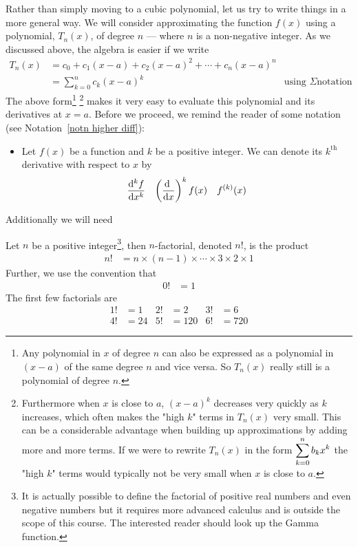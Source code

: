 Rather than simply moving to a cubic polynomial, let us try to write things in a more
general way. We will consider approximating the function $f(x)$ using a polynomial,
$T_n(x)$, of degree $n$ --- where $n$ is a non-negative integer. As we discussed
above, the algebra is easier if we write
\begin{align*}
  T_n(x) &= c_0 + c_1(x-a) + c_2 (x-a)^2 + \cdots + c_n (x-a)^n\\
  &= \sum_{k=0}^n c_k (x-a)^k & \text{using $\Sigma$
notation}
\end{align*}
The above form\footnote{Any polynomial in $x$ of degree $n$ can also be
expressed as a polynomial in $(x-a)$ of the same degree $n$ and vice versa.  So
$T_n(x)$ really still is a polynomial of degree $n$.} \footnote{Furthermore
when $x$ is close to $a$, $(x-a)^k$ decreases very quickly as $k$ increases,
which often makes the "high $k$" terms in $T_n(x)$ very small. This can be a
considerable advantage when building up approximations by adding more and more
terms.  If we were to rewrite  $T_n(x)$ in the form $\displaystyle \sum_{k=0}^n b_k x^k$
the "high $k$" terms would typically not be very small when $x$ is close to
$a$. } makes it very easy to evaluate this polynomial and its derivatives at
$x=a$. Before we proceed, we remind the reader of some notation (see
Notation~\ref{notn higher diff}):
\begin{itemize}
 \item Let $f(x)$ be a function and $k$ be a positive integer. We can denote
its $k^\mathrm{th}$ derivative with respect to $x$ by
\begin{align*}
  \ddiff{k}{f}{x} && \left( \diff{}{x}\right)^k f(x) && f^{(k)}(x)
\end{align*}
\end{itemize}

Additionally we will need
\begin{defn}[Factorial]
  Let $n$ be a positive integer\footnote{It is actually possible to define the
factorial of positive real numbers and even negative numbers but it requires more
advanced calculus and is outside the scope of this course. The interested reader should
look up the Gamma function.}, then $n$-factorial, denoted $n!$, is the product
  \begin{align*}
    n! &= n \times (n-1) \times \cdots \times 3 \times 2 \times 1
  \end{align*}
  Further, we use the convention that
  \begin{align*}
  0! &= 1
  \end{align*}
  The first few factorials are
\begin{align*}
  1! &=1 &
  2! &=2 &
  3! &=6 \\
  4! &=24 &
  5! &=120 &
  6! &=720
\end{align*}
\end{defn}

